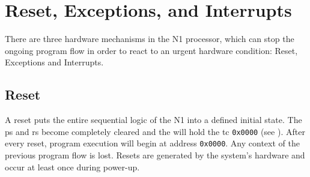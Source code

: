 
\section{Reset, Exceptions, and Interrupts}
\label{reset}

There are three hardware mechanisms in the N1 processor, which can stop the ongoing
program flow in order to react to an urgent hardware condition:
Reset, Exceptions and Interrupts.

\subsection{Reset}
\label{reset:rst}
A reset puts the entire sequential logic of the N1 into a defined initial state.
The  \gls{ps} and \gls{rs} become completely cleared and the  will hold
the \gls{tc} \texttt{0x0000} (see ).
After every reset, program execution will begin at address \texttt{0x0000}.
Any context of the previous program flow is lost.
Resets are generated by the system's hardware and occur at least once during power-up.

